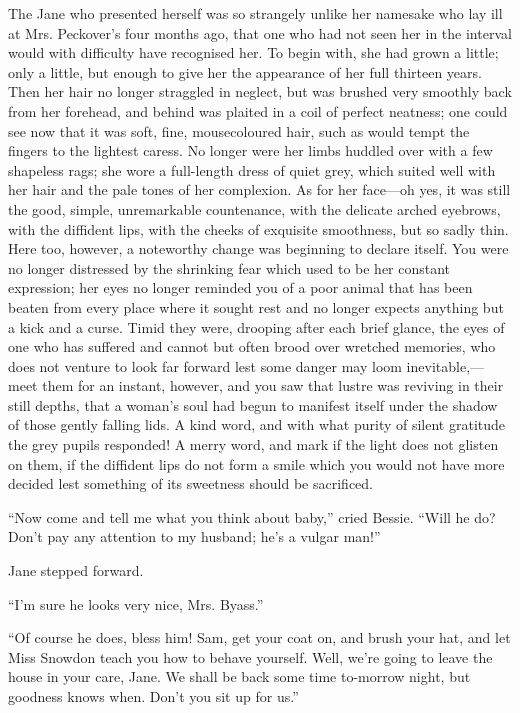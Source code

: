 The Jane who presented herself was so strangely unlike her namesake who
lay ill at Mrs. Peckover's four months ago, that one who had not seen
her in the interval would with difficulty have recognised her. To begin
with, she had grown a little; only a little, but enough to give her the
appearance of her full thirteen years. Then her hair no longer straggled
in neglect, but was brushed very smoothly back from her forehead, and
behind was plaited in a coil of perfect neatness; one could see now that
it was soft, fine, mousecoloured hair, such as would tempt the fingers
to the lightest caress. No longer were her
{\protect\hypertarget{237}{}{}}limbs huddled over with a few shapeless
rags; she wore a full-length dress of quiet grey, which suited well with
her hair and the pale tones of her complexion. As for her face---oh yes,
it was still the good, simple, unremarkable countenance, with the
delicate arched eyebrows, with the diffident lips, with the cheeks of
exquisite smoothness, but so sadly thin. Here too, however, a noteworthy
change was beginning to declare itself. You were no longer distressed by
the shrinking fear which used to be her constant expression; her eyes no
longer reminded you of a poor animal that has been beaten from every
place where it sought rest and no longer expects anything but a kick and
a curse. Timid they were, drooping after each brief glance, the eyes of
one who has suffered and cannot but often brood over wretched memories,
who does not venture to look far forward lest some danger may loom
inevitable,---meet them for an instant, however, and you saw that lustre
was reviving in their still depths, that a woman's soul had begun to
manifest itself {\protect\hypertarget{238}{}{}}under the shadow of those
gently falling lids. A kind word, and with what purity of silent
gratitude the grey pupils responded! A merry word, and mark if the light
does not glisten on them, if the diffident lips do not form a smile
which you would not have more decided lest something of its sweetness
should be sacrificed.

``Now come and tell me what you think about baby,'' cried Bessie. ``Will
he do? Don't pay any attention to my husband; he's a vulgar man!''

Jane stepped forward.

``I'm sure he looks very nice, Mrs. Byass.''

``Of course he does, bless him! Sam, get your coat on, and brush your
hat, and let Miss Snowdon teach you how to behave yourself. Well, we're
going to leave the house in your care, Jane. We shall be back some time
to-morrow night, but goodness knows when. Don't you sit up for us.''

